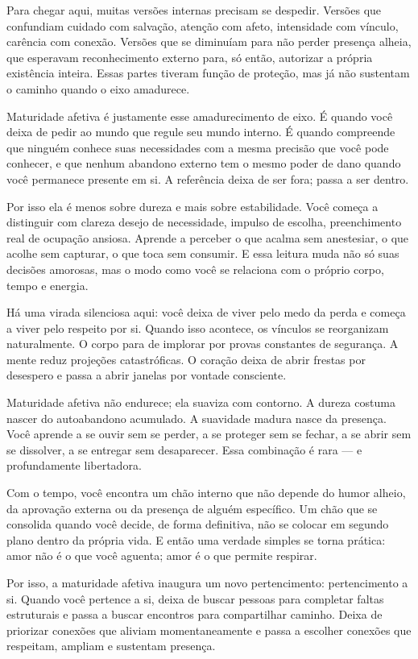 \documentclass[12pt]{book}
\begin{document}
Para chegar aqui, muitas versões internas precisam se despedir. Versões que confundiam cuidado com salvação, atenção com afeto, intensidade com vínculo, carência com conexão. Versões que se diminuíam para não perder presença alheia, que esperavam reconhecimento externo para, só então, autorizar a própria existência inteira. Essas partes tiveram função de proteção, mas já não sustentam o caminho quando o eixo amadurece.

Maturidade afetiva é justamente esse amadurecimento de eixo. É quando você deixa de pedir ao mundo que regule seu mundo interno. É quando compreende que ninguém conhece suas necessidades com a mesma precisão que você pode conhecer, e que nenhum abandono externo tem o mesmo poder de dano quando você permanece presente em si. A referência deixa de ser fora; passa a ser dentro.

Por isso ela é menos sobre dureza e mais sobre estabilidade. Você começa a distinguir com clareza desejo de necessidade, impulso de escolha, preenchimento real de ocupação ansiosa. Aprende a perceber o que acalma sem anestesiar, o que acolhe sem capturar, o que toca sem consumir. E essa leitura muda não só suas decisões amorosas, mas o modo como você se relaciona com o próprio corpo, tempo e energia.

Há uma virada silenciosa aqui: você deixa de viver pelo medo da perda e começa a viver pelo respeito por si. Quando isso acontece, os vínculos se reorganizam naturalmente. O corpo para de implorar por provas constantes de segurança. A mente reduz projeções catastróficas. O coração deixa de abrir frestas por desespero e passa a abrir janelas por vontade consciente.

Maturidade afetiva não endurece; ela suaviza com contorno. A dureza costuma nascer do autoabandono acumulado. A suavidade madura nasce da presença. Você aprende a se ouvir sem se perder, a se proteger sem se fechar, a se abrir sem se dissolver, a se entregar sem desaparecer. Essa combinação é rara — e profundamente libertadora.

Com o tempo, você encontra um chão interno que não depende do humor alheio, da aprovação externa ou da presença de alguém específico. Um chão que se consolida quando você decide, de forma definitiva, não se colocar em segundo plano dentro da própria vida. E então uma verdade simples se torna prática: amor não é o que você aguenta; amor é o que permite respirar.

Por isso, a maturidade afetiva inaugura um novo pertencimento: pertencimento a si. Quando você pertence a si, deixa de buscar pessoas para completar faltas estruturais e passa a buscar encontros para compartilhar caminho. Deixa de priorizar conexões que aliviam momentaneamente e passa a escolher conexões que respeitam, ampliam e sustentam presença.
\end{document}
